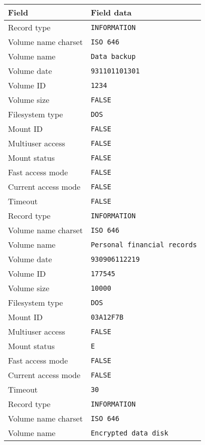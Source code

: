 \begin{center}
\begin{tabular}{|l|l|}
\hline
    Field                &   Field data\\
\hline
    Record type          &   {\tt INFORMATION}\\
    Volume name charset  &   {\tt ISO 646}\\
    Volume name          &   {\tt Data backup}\\
    Volume date          &   {\tt 931101101301}\\
    Volume ID            &   {\tt 1234}\\
    Volume size          &   {\tt FALSE}\\
    Filesystem type      &   {\tt DOS}\\
    Mount ID             &   {\tt FALSE}\\
    Multiuser access     &   {\tt FALSE}\\
    Mount status         &   {\tt FALSE}\\
    Fast access mode     &   {\tt FALSE}\\
    Current access mode  &   {\tt FALSE}\\
    Timeout              &   {\tt FALSE}\\
    Record type          &   {\tt INFORMATION}\\
    Volume name charset  &   {\tt ISO 646}\\
    Volume name          &   {\tt Personal financial records}\\
    Volume date          &   {\tt 930906112219}\\
    Volume ID            &   {\tt 177545}\\
    Volume size          &   {\tt 10000}\\
    Filesystem type      &   {\tt DOS}\\
    Mount ID             &   {\tt 03A12F7B}\\
    Multiuser access     &   {\tt FALSE}\\
    Mount status         &   {\tt E}\\
    Fast access mode     &   {\tt FALSE}\\
    Current access mode  &   {\tt FALSE}\\
    Timeout              &   {\tt 30}\\
    Record type          &   {\tt INFORMATION}\\
    Volume name charset  &   {\tt ISO 646}\\
    Volume name          &   {\tt Encrypted data disk}\\

\end{tabular}
\end{center}
